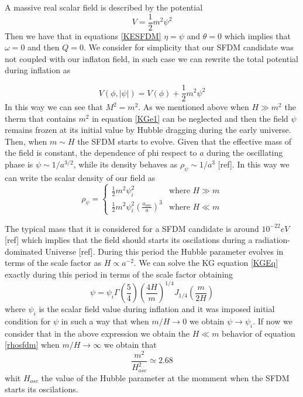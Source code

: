 \documentclass[twocolumn,           %
               showpacs,            %
               preprintnumbers,     %
               aps,                 %
               prl,          	    %
               letterpaper,             %
               superscriptaddress,      %
               nofootinbib,         %
               tightenlines,        %
               floats,floatfix      %
               ,usenatbib,
               ]{revtex4-1}
\begin{document}
A massive real scalar field is described by the potential 
\begin{equation}
V = \frac{1}{2}m^2\psi^2
\end{equation}
Then we have that in equations \eqref{KESFDM} $\eta=\psi$ and $\theta=0$ which implies that $\omega=0$ and then $Q = 0$. We consider for simplicity that our SFDM candidate was not coupled with our inflaton field, in such case we can rewrite the total potential during inflation as

\begin{equation}
V(\phi,|\psi|)=V(\phi)+\frac{1}{2}m^2\psi^2
\end{equation}
In this way we can see that $M^2=m^2$. As we mentioned above when $H\gg m^2$ the therm that contains $m^2$ in equation \eqref{KGe1} can be neglected and then the field $\psi$ remains frozen at its initial value by Hubble dragging during the early universe. Then, when $m\sim H$ the SFDM starts to evolve. Given that the effective mass of the field is constant, the dependence of phi respect to $a$ during the oscillating phase is $\psi\sim 1/a^{3/2}$, while its density behaves as $\rho_{\psi}\sim 1/a^3$  [ref]. In this way we can write the scalar density of our field as
\begin{equation}\label{rhosfdm}
\rho_\psi = \left\lbrace\begin{array}{ll}
\frac{1}{2}m^2\psi_i^2 & \text{where }H\gg m \\
\frac{1}{2}m^2\psi_i^2\left(\frac{a_{osc}}{a}\right)^3 & \text{where }H\ll m
\end{array}\right .
\end{equation}

The typical mass that it is considered for a SFDM candidate is around $10^{-22} eV$ [ref] which implies that the field should starts its oscilations during a radiation-dominated Universe [ref]. During this period the Hubble parameter evolves in terms of the scale factor as $H\propto a^{-2}$. We can solve the KG equation \eqref{KGEq} exactly during this period in terms of the scale factor obtaining
\begin{equation}
\psi = \psi_i\Gamma\left(\frac{5}{4}\right)\left(\frac{4H}{m}\right)^{1/4}J_{1/4}\left(\frac{m}{2H}\right)
\end{equation}
where $\psi_i$ is the scalar field value during inflation and it was imposed initial condition for $\psi$ in such a way that when $m/H\rightarrow 0$ we obtain $\psi\rightarrow\psi_i$. If now we consider that in the above expression we obtain the $H\ll m$ behavior of equation \eqref{rhosfdm} when $m/H\rightarrow \infty$ we obtain that
\begin{equation}\label{m_osc}
\frac{m^2}{H_{osc}^2}\simeq 2.68
\end{equation}
whit $H_{osc}$ the value of the Hubble parameter at the momment when the SFDM starts its oscilations.
\end{document}
